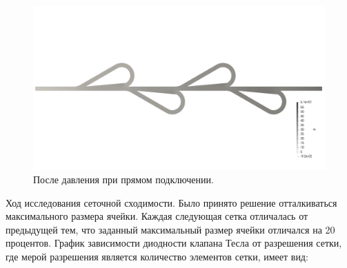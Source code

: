 \documentclass[14pt,a4paper]{article}
\begin{document}
        \begin{figure}[H]
            \centering
            \includegraphics[width = 1\linewidth]{PFieldsDirect}
            \caption{После давления при прямом подключении.}
            \label{fig:PFieldsDirect}
        \end{figure}
         
            
        Ход исследования сеточной сходимости. Было принято решение отталкиваться максимального размера ячейки. Каждая следующая сетка отличалась от предыдущей тем, что заданный максимальный размер ячейки отличался на 20 процентов. График зависимости диодности клапана Тесла от разрешения сетки, где мерой разрешения является количество элементов сетки, имеет вид:
        \\
        
\end{document}

